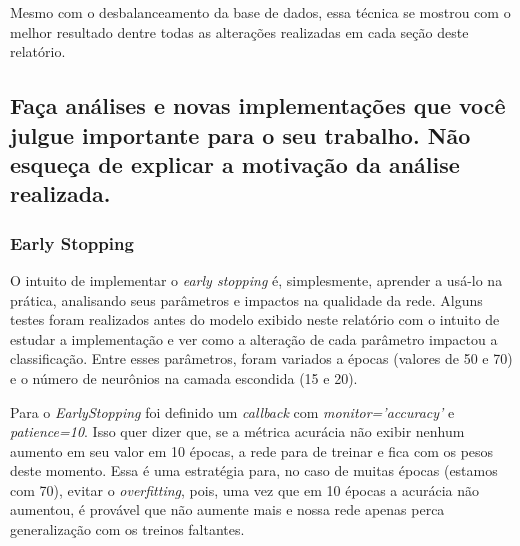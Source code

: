\documentclass[12pt]{article}
\begin{document}
Mesmo com o desbalanceamento da base de dados, essa técnica se mostrou com o melhor resultado dentre todas as alterações realizadas em cada seção deste relatório.

\subsection{Faça análises e novas implementações que você julgue importante para o seu trabalho. Não esqueça de explicar a motivação da análise realizada.}

\subsubsection{Early Stopping}

O intuito de implementar o \textit{early stopping} é, simplesmente, aprender a usá-lo na prática, analisando seus parâmetros e impactos na qualidade da rede. Alguns testes foram realizados antes do modelo exibido neste relatório com o intuito de estudar a implementação e ver como a alteração de cada parâmetro impactou a classificação. Entre esses parâmetros, foram variados a épocas (valores de 50 e 70) e o número de neurônios na camada escondida (15 e 20).

Para o \textit{EarlyStopping} foi definido um \textit{callback} com \textit{monitor='accuracy'} e \textit{patience=10}. Isso quer dizer que, se a métrica acurácia não exibir nenhum aumento em seu valor em 10 épocas, a rede para de treinar e fica com os pesos deste momento. Essa é uma estratégia para, no caso de muitas épocas (estamos com 70), evitar o \textit{overfitting}, pois, uma vez que em 10 épocas a acurácia não aumentou, é provável que não aumente mais e nossa rede apenas perca generalização com os treinos faltantes.
\end{document}
